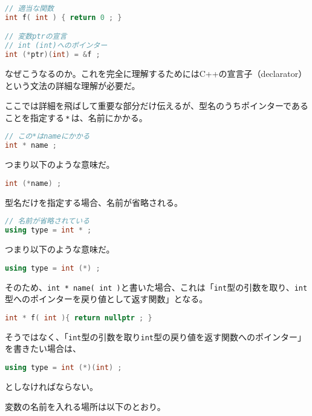 \begin{lstlisting}[language={C++}]
// 適当な関数
int f( int ) { return 0 ; }

// 変数ptrの宣言
// int (int)へのポインター
int (*ptr)(int) = &f ;
\end{lstlisting}

なぜこうなるのか。これを完全に理解するためにはC++の宣言子（declarator）という文法の詳細な理解が必要だ。

ここでは詳細を飛ばして重要な部分だけ伝えるが、型名のうちポインターであることを指定する\,\texttt{*}\,は、名前にかかる。

\begin{lstlisting}[language={C++}]
// この*はnameにかかる
int * name ;
\end{lstlisting}

つまり以下のような意味だ。

\begin{lstlisting}[language={C++}]
int (*name) ;
\end{lstlisting}

型名だけを指定する場合、名前が省略される。

\begin{lstlisting}[language={C++}]
// 名前が省略されている
using type = int * ;
\end{lstlisting}

つまり以下のような意味だ。

\begin{lstlisting}[language={C++}]
using type = int (*) ;
\end{lstlisting}

そのため、\texttt{int * name( int )}と書いた場合、これは「\texttt{int}型の引数を取り、\texttt{int}型へのポインターを戻り値として返す関数」となる。

\begin{lstlisting}[language={C++}]
int * f( int ){ return nullptr ; }
\end{lstlisting}

\ifTombow\pagebreak\fi
そうではなく、「\texttt{int}型の引数を取り\texttt{int}型の戻り値を返す関数へのポインター」を書きたい場合は、

\begin{lstlisting}[language={C++}]
using type = int (*)(int) ;
\end{lstlisting}
としなければならない。

変数の名前を入れる場所は以下のとおり。

